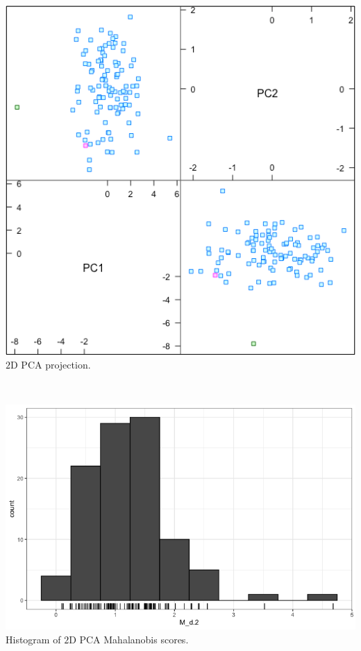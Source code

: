 \documentclass[20pt,landscape,footrule,headrule]{foils}
\begin{document}
{{\begin{itemize}
\end{itemize}
\newpage\ \begin{center}
\includegraphics[height=0.85\textheight]{Images/PCA_1} \\ $2$D PCA projection.
\end{center}
\newpage\ \begin{center}
\includegraphics[height=0.85\textheight]{Images/PCA_Maha0} \\ Histogram of $2$D PCA Mahalanobis scores.
\end{center}
\newpage \begin{center}

\end{center}}}
\end{document}
